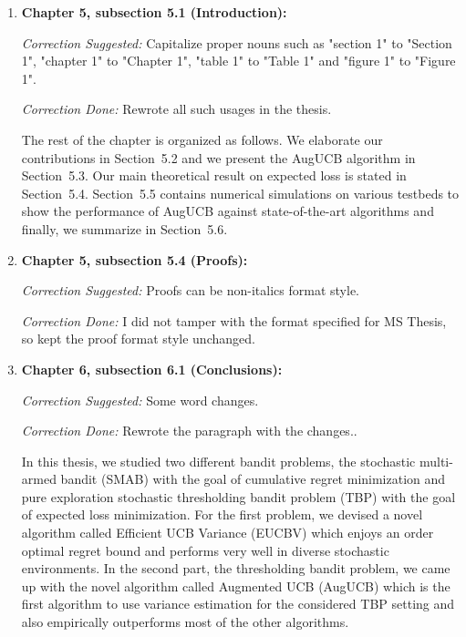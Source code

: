 \documentclass[twoside]{article}
\begin{document}
\begin{enumerate}
\item  \textbf{Chapter 5, subsection 5.1 (Introduction):} 

\textit{Correction Suggested:} Capitalize proper nouns such as "section 1"  to "Section 1", "chapter 1" to "Chapter 1", "table 1" to "Table 1" and "figure 1" to "Figure 1".

\textit{Correction Done:} Rewrote all such usages in the thesis.

The rest of the chapter is organized as follows. We elaborate our contributions in Section~5.2 and  we present the AugUCB algorithm in Section~5.3. Our main theoretical result on expected loss is stated in Section~5.4. Section~5.5 contains numerical simulations on various testbeds to show the performance of AugUCB against state-of-the-art algorithms and finally, we summarize in Section~5.6.

\item \textbf{Chapter 5, subsection 5.4 (Proofs):}

\textit{Correction Suggested:} Proofs can be non-italics format style.

\textit{Correction Done:} I did not tamper with the format specified for MS Thesis, so kept the proof format style unchanged.


\item \textbf{Chapter 6, subsection 6.1 (Conclusions):} 

\textit{Correction Suggested:} Some word changes.

\textit{Correction Done:} Rewrote the paragraph with the changes..

In this thesis, we studied two different bandit problems, the stochastic multi-armed bandit (SMAB) with the goal of cumulative regret minimization and pure exploration stochastic thresholding bandit problem (TBP) with the goal of expected loss minimization. For the first problem, we devised a novel algorithm called Efficient UCB Variance (EUCBV) which enjoys an order optimal regret bound and performs very well in diverse stochastic environments. In the second part, the thresholding bandit problem, we came up with the novel algorithm called Augmented UCB (AugUCB) which is the first algorithm to use variance estimation for the considered TBP setting and also empirically outperforms most of the other algorithms. 

\end{enumerate}
\end{document}
